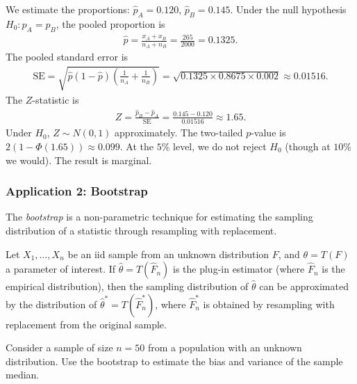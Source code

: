 \begin{solucion}
We estimate the proportions: $\hat{p}_A = 0.120$, $\hat{p}_B = 0.145$. Under the null hypothesis $H_0: p_A = p_B$, the pooled proportion is
\begin{align}
 \hat{p} = \frac{x_A + x_B}{n_A + n_B} = \frac{265}{2000} = 0.1325.
\end{align}
The pooled standard error is
\begin{align}
 \text{SE} = \sqrt{\hat{p}(1-\hat{p})\left(\frac{1}{n_A} + \frac{1}{n_B}\right)}
 = \sqrt{0.1325 \times 0.8675 \times 0.002} \approx 0.01516.
\end{align}
The $Z$-statistic is
\begin{align}
 Z = \frac{\hat{p}_B - \hat{p}_A}{\text{SE}} = \frac{0.145 - 0.120}{0.01516} \approx 1.65.
\end{align}
Under $H_0$, $Z \sim N(0,1)$ approximately. The two-tailed $p$-value is $2(1 - \Phi(1.65)) \approx 0.099$. At the $5\%$ level, we do not reject $H_0$ (though at $10\%$ we would). The result is marginal.
\end{solucion}



\subsubsection{Application 2: Bootstrap}

The \emph{bootstrap} is a non-parametric technique for estimating the sampling distribution of a statistic through resampling with replacement.

\begin{teorema}
Let $X_1, \ldots, X_n$ be an iid sample from an unknown distribution $F$, and $\theta = T(F)$ a parameter of interest. If $\hat{\theta} = T(\hat{F}_n)$ is the plug-in estimator (where $\hat{F}_n$ is the empirical distribution), then the sampling distribution of $\hat{\theta}$ can be approximated by the distribution of $\hat{\theta}^* = T(\hat{F}_n^*)$, where $\hat{F}_n^*$ is obtained by resampling with replacement from the original sample.
\end{teorema}

\begin{ejemplo}
 \label{exmp:3.2.8}
Consider a sample of size $n = 50$ from a population with an unknown distribution. Use the bootstrap to estimate the bias and variance of the sample median.
\end{ejemplo}

